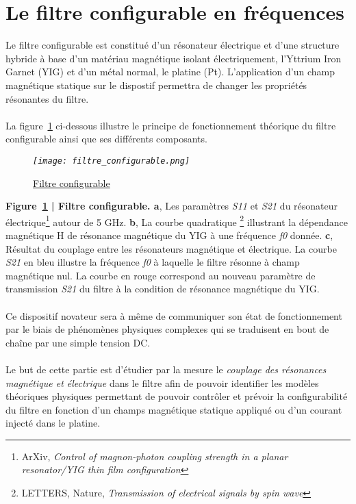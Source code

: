 \documentclass[12pt,fleqn]{book} %
\begin{document}
\part{Le filtre configurable en fréquences}
Le filtre configurable est constitué d’un résonateur électrique et d’une
structure hybride à base d’un matériau magnétique isolant électriquement, l’Yttrium
Iron Garnet (YIG) et d’un métal normal, le platine (Pt). L’application d’un champ
magnétique statique sur le dispostif permettra de changer les propriétés résonantes du
filtre.
~\\\\La figure~\underline{\color{blue}\ref{filtre}} ci-dessous illustre le principe de fonctionnement théorique du filtre configurable ainsi que ses différents composants.
\begin{figure}[H]
	\centering
	\itshape
	\texttt{[image: filtre\_configurable.png]}
	\caption{\label{filtre} \underline{Filtre configurable}}
\end{figure}
\noindent\footnotesize  \textbf{Figure~\underline{\color{blue}\ref{filtre}} | Filtre configurable. a}, Les paramètres \emph{S11} et \emph{S21} du résonateur électrique\footnote{ArXiv, \emph{Control of magnon-photon coupling strength in a planar resonator\slash YIG thin film configuration}} autour de 5 GHz. \textbf{b}, La courbe quadratique \footnote{LETTERS, Nature, \emph{Transmission of electrical signals by spin wave}} illustrant la dépendance magnétique H de résonance magnétique du YIG à une fréquence \emph{f0} donnée. \textbf{c}, Résultat du couplage entre les résonateurs magnétique et électrique\footnotemark[2]. La courbe \emph{S21} en bleu illustre la fréquence \emph{f0} à laquelle le filtre résonne à champ magnétique nul. La courbe en rouge correspond au nouveau paramètre de transmission \emph{S21} du filtre à la condition de résonance magnétique du YIG. 
~\\\\
\normalsize Ce dispositif novateur sera à même de communiquer son état de fonctionnement par le
biais de phénomènes physiques complexes qui se traduisent en bout de chaîne par une simple tension
DC.
~\\\\Le but de cette partie est d'étudier par la mesure le \emph{couplage des résonances magnétique et électrique} dans le filtre afin de pouvoir identifier les modèles théoriques physiques permettant de pouvoir contrôler et prévoir la configurabilité du filtre en fonction d'un champs magnétique statique appliqué ou d'un courant injecté dans le platine.
\end{document}
